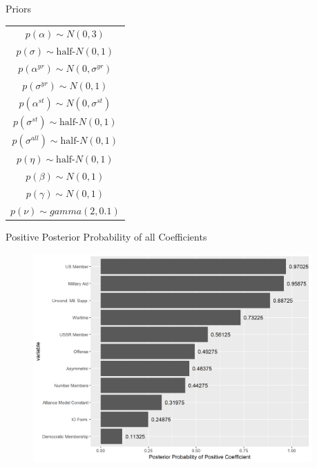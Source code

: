 \documentclass{beamer}
\begin{document}


\begin{frame}{Priors}

\begin{table} %

 \begin{center}
\begin{tabular}{c} 
$ p(\alpha) \sim N(0, 3)$  \\
$ p(\sigma) \sim \mbox{half-}N(0, 1) $ \\
$ p(\alpha^{yr}) \sim N(0, \sigma^{yr}) $ \\ 
$ p(\sigma^{yr}) \sim N(0, 1) $ \\
$ p(\alpha^{st}) \sim N(0, \sigma^{st}) $ \\ 
$ p(\sigma^{st}) \sim \mbox{half-}N(0, 1) $ \\ 
$ p(\sigma^{all}) \sim \mbox{half-}N(0, 1) $ \\
$ p(\eta) \sim \mbox{half-}N(0, 1) $ \\
$ p(\beta) \sim N(0, 1) $ \\
$ p(\gamma) \sim N(0, 1) $ \\ 
$ p(\nu) \sim gamma(2, 0.1)$ 
\end{tabular} 
\end{center} 
\label{tab:priors}
\end{table} 


\end{frame}


\begin{frame}{Positive Posterior Probability of all Coefficients}

\begin{figure}
	\centering
		\includegraphics[width=0.95\textwidth]{post-prob-beta.png}
	\label{fig:post-prob-beta}
\end{figure}


\end{frame}
\end{document}
